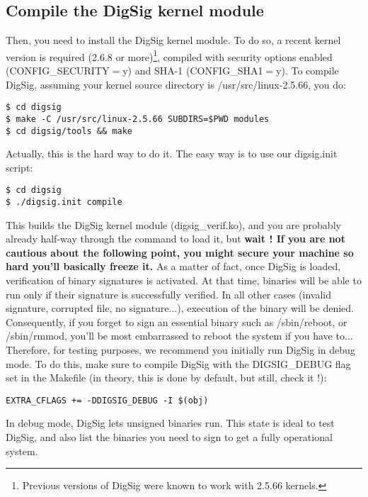 \documentclass{article}
\begin{document}
\subsection{Compile the DigSig kernel module}
\label{sec:compile}

Then, you need to install the DigSig kernel module. To do so, a recent
kernel version is required (2.6.8 or more)\footnote{Previous versions of DigSig were known to work with 2.5.66 kernels.}, compiled with security
options enabled (CONFIG\_SECURITY$=$y) and SHA-1 (CONFIG\_SHA1$=$y).
To compile DigSig, assuming your
kernel source directory is /usr/src/linux-2.5.66, you do:

\small
\begin{verbatim} 
$ cd digsig
$ make -C /usr/src/linux-2.5.66 SUBDIRS=$PWD modules
$ cd digsig/tools && make
\end{verbatim} 
\normalsize

Actually, this is the hard way to do it. The easy way is to
use our digsig.init script:
\small
\begin{verbatim}
$ cd digsig
$ ./digsig.init compile
\end{verbatim}
\normalsize

This builds the DigSig kernel module (digsig\_verif.ko), and you are
probably already half-way through the command to load it, but {\bf wait !
If you are not cautious about the following point, you might secure
your machine so hard you'll basically freeze it.} As a matter of fact,
once DigSig is loaded, verification of binary signatures is activated.
At that time, binaries will be able to run only if their signature is
successfully verified. In all other cases (invalid signature,
corrupted file, no signature...), execution of the binary will be
denied. Consequently, if you forget to sign an essential binary such
as /sbin/reboot, or /sbin/rmmod, you'll be most embarrassed to reboot
the system if you have to...  
Therefore, for testing purposes, we
recommend you initially run DigSig in debug mode. To do this, make sure
to compile DigSig with the DIGSIG\_DEBUG flag set in the Makefile (in
theory, this is done by default, but still, check it !):

\small
\begin{verbatim} 
EXTRA_CFLAGS += -DDIGSIG_DEBUG -I $(obj)
\end{verbatim} 
\normalsize

In debug mode, DigSig lets unsigned binaries run. This state is ideal
to test DigSig, and also list the binaries you need to sign to get a
fully operational system.
\end{document}
